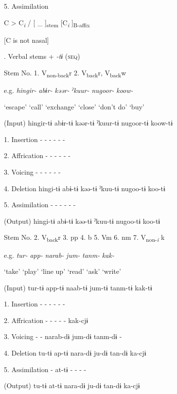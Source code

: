   5.  Assimilation

    C  >  C\textit{\textsubscript{i}}  /  [   \_ ]\textsubscript{stem}  [C\textit{\textsubscript{i}}  ]\textsubscript{B-affix}

    [C is not nasal]      

\begin{styleBeschriftung}
\textmd{. Verbal stems +} \textmd{\textit{{}-tɨ}}\textmd{ (\textsc{seq})}
\end{styleBeschriftung}

Stem No.  1. V\textsubscript{non-back}r  2. V\textsubscript{back}r, V\textsubscript{back}w

  e.g.  \textit{hingir-}  \textit{abɨr-}  \textit{kəər-}  \textit{ˀkuur-}  \textit{nugoor-}  \textit{koow-}

    ‘escape’  ‘call’  ‘exchange’  ‘close’  ‘don’t do’  ‘buy’

  (Input)  hingir-tɨ  abɨr-tɨ  kəər-tɨ  ˀkuur-tɨ  nugoor-tɨ  koow-tɨ

1.  Insertion  {}-  {}-  {}-  {}-  {}-  {}-

2.  Affrication  {}-  {}-  {}-  {}-  {}-  {}-

3.  Voicing  {}-  {}-  {}-  {}-  {}-  {}-

4.  Deletion  hingi-tɨ  abɨ-tɨ  kəə-tɨ  ˀkuu-tɨ  nugoo-tɨ  koo-tɨ

5.  Assimilation  {}-  {}-  {}-  {}-  {}-  {}-

  (Output)  hingi-tɨ  abɨ-tɨ  kəə-tɨ  ˀkuu-tɨ  nugoo-tɨ  koo-tɨ

Stem No.  2. V\textsubscript{back}r  3. pp  4. b  5. Vm  6. nm  7. V\textsubscript{non-}\textit{\textsubscript{i} }k

  e.g.  \textit{tur-}  \textit{app-}  \textit{narab-}  \textit{jum-}  \textit{tanm-}  \textit{kak-}

    ‘take’  ‘play’  ‘line up’  ‘read’  ‘ask’  ‘write’

  (Input)  tur-tɨ  app-tɨ  naab-tɨ  jum-tɨ  tanm-tɨ  kak-tɨ

1.  Insertion  {}-  {}-  {}-  {}-  {}-  {}-

2.  Affrication  {}-  {}-  {}-  {}-  {}-  kak-cjɨ

3.  Voicing  {}-  {}-  narab-dɨ  jum-dɨ  tanm-dɨ  {}-

4.  Deletion  tu-tɨ  ap-tɨ  nara-dɨ  ju-dɨ  tan-dɨ  ka-cjɨ

5.  Assimilation  {}-  at-tɨ  {}-  {}-  {}-  {}-

  (Output)  tu-tɨ  at-tɨ  nara-dɨ  ju-dɨ  tan-dɨ  ka-cjɨ

